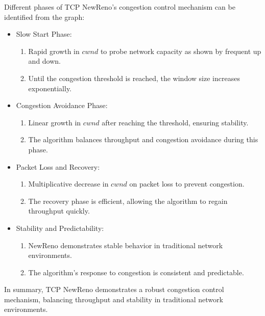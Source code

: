 \documentclass[11pt,a4paper]{article}
\begin{document}
Different phases of TCP NewReno's congestion control mechanism can be identified from the graph:
\begin{itemize}
    \item Slow Start Phase: {
        \begin{enumerate}
            \item Rapid growth in $cwnd$ to probe network capacity as shown by frequent up and down.
            \item Until the congestion threshold is reached, the window size increases exponentially.
        \end{enumerate}
    }
    \item Congestion Avoidance Phase: {
        \begin{enumerate}
            \item Linear growth in $cwnd$ after reaching the threshold, ensuring stability.
            \item The algorithm balances throughput and congestion avoidance during this phase.
        \end{enumerate}
    }
    \item Packet Loss and Recovery: {
        \begin{enumerate}
            \item Multiplicative decrease in $cwnd$ on packet loss to prevent congestion.
            \item The recovery phase is efficient, allowing the algorithm to regain throughput quickly.
        \end{enumerate}
    }
    \item Stability and Predictability: {
        \begin{enumerate}
            \item NewReno demonstrates stable behavior in traditional network environments.
            \item The algorithm's response to congestion is consistent and predictable.
        \end{enumerate}
    }
\end{itemize}

In summary, TCP NewReno demonstrates a robust congestion control mechanism, balancing throughput and stability in traditional network environments.
\end{document}
